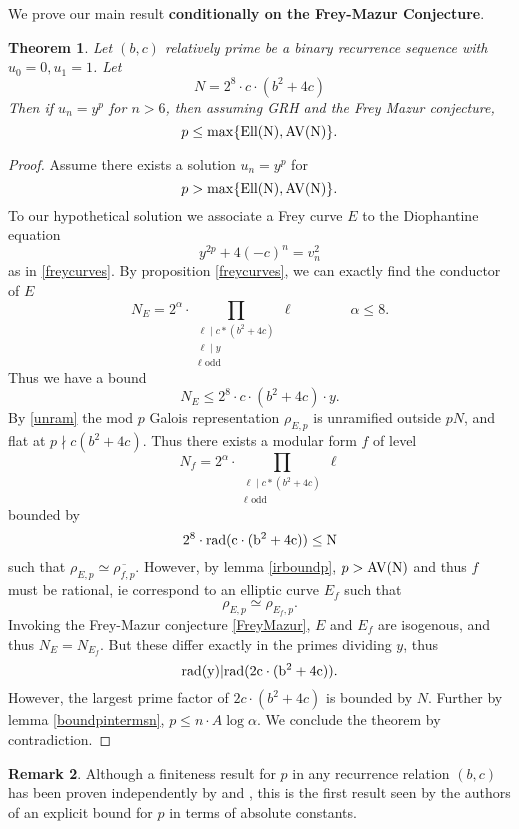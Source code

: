 \documentclass[12pt]{amsart}
\newtheorem{thm}{Theorem}[section]
\theoremstyle{definition}
\newtheorem{rem}[thm]{Remark}
\newcommand{\rad}{\rm rad}
\renewcommand{\bar}{\overline}
\newcommand{\notdiv}{\nmid}
\newcommand{\Ell}{\rm Ell}
\newcommand{\AV}{\rm AV}
\begin{document}
We prove our main result \textbf{conditionally on the Frey-Mazur Conjecture}.


\begin{thm}\label{condbound}
Let $(b,c)$ relatively prime be a binary recurrence sequence with $u_0=0,u_1=1$.  Let 
\[ N = 2^8 \cdot c \cdot (b^2+4c) \]
Then if $u_n = y^p$ for $n> 6$, then assuming GRH and the Frey Mazur conjecture,
\[ p \leq \max\{ \Ell(N), \AV(N) \}. \]
\end{thm}

\begin{proof}
Assume there exists a solution $u_n = y^p$ for 
\[ p > \max\{ \Ell(N), \AV(N) \}. \]
To our hypothetical solution we associate a Frey curve $E$ to the Diophantine equation
\[ y^{2p} +4(-c)^n = v_n^2 \]
as in \ref{freycurves}.  By proposition \ref{freycurves}, we can exactly find the conductor of $E$
\[ N_E = 2^{\alpha}  \cdot \prod_{\substack{ \ell \mid c*(b^2+4c) \\ \ell \mid y \\ \ell \text{ odd}}} \ell \qquad \qquad \alpha \leq 8. \]
Thus we have a bound
\[ N_E \leq  2^{8} \cdot c \cdot (b^2+4c) \cdot y.\] 
By \ref{unram} the mod $p$ Galois representation $\rho_{E,p}$ is unramified outside $pN$, and flat at $p \notdiv c(b^2+4c)$.  Thus there exists a modular form $f$ of level 
\[N_f = 2^{\alpha} \cdot \prod_{\substack{ \ell \mid c*(b^2+4c) \\ \ell \text{ odd}}} \ell \]
bounded by 
\[ 2^8 \cdot  \rad(c \cdot (b^2+4c)) \leq N \]
such that $\rho_{E,p} \simeq \bar{\rho_{f,p}} $.  However, by lemma \ref{irboundp}, $p>\AV(N)$ and thus $f$ must be rational, ie correspond to an elliptic curve $E_f$ such that
\[ \rho_{E,p} \simeq \rho_{E_f,p}. \]  
Invoking the Frey-Mazur conjecture \ref{FreyMazur}, $E$ and $E_f$ are isogenous, and thus $N_E = N_{E_f}$.  But these differ exactly in the primes dividing $y$, thus
\[ \rad(y) | \rad(2c \cdot (b^2+4c)). \]
However, the largest prime factor of $2c \cdot (b^2+4c)$ is bounded by $N$.  Further by lemma \ref{boundpintermsn}, $p \leq n \cdot A\log{\alpha}$.  We conclude the theorem by contradiction.
\end{proof}

\begin{rem}
Although a finiteness result for $p$ in any recurrence relation $(b,c)$ has been proven independently by \cite{petho82} and \cite{shorey83}, this is the first result seen by the authors of an explicit bound for $p$ in terms of absolute constants.
\end{rem}
\end{document}
